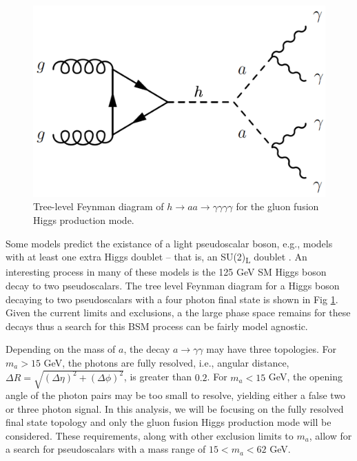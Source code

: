 \documentclass[12pt]{article}
\begin{document}
\begin{figure}
   \centering
   \includegraphics[width=0.45\linewidth]{figures/h4g-feynman-diagram.png}
   \caption{Tree-level Feynman diagram of $h\rightarrow aa \rightarrow \gamma\gamma\gamma\gamma$ for the gluon fusion Higgs production mode.}
   \label{fig:h4g-feynman-diag}
\end{figure}

Some models predict the existance of a light pseudoscalar boson, e.g., models with at least one extra Higgs doublet -- that is, an SU(2)\textsubscript{L} doublet \cite{Curtin_2014}. An interesting process in many of these models is the 125 GeV SM Higgs boson decay to two pseudoscalars. The tree level Feynman diagram for a Higgs boson decaying to two pseudoscalars with a four photon final state is shown in Fig \ref{fig:h4g-feynman-diag}. Given the current limits and exclusions, a the large phase space remains for these decays thus a search for this BSM process can be fairly model agnostic.\par

Depending on the mass of $a$, the decay $a\rightarrow \gamma\gamma$ may have three topologies. For $m_{a} > 15$ GeV, the photons are fully resolved, i.e., angular distance, $\Delta R = \sqrt{(\Delta \eta)^2 + (\Delta \phi)^2}$, is greater than $0.2$. For $m_{a} < 15$ GeV, the opening angle of the photon pairs may be too small to resolve, yielding either a false two or three photon signal. In this analysis, we will be focusing on the fully resolved final state topology and only the gluon fusion Higgs production mode will be considered. These requirements, along with other exclusion limits to $m_{a}$, allow for a search for pseudoscalars with a mass range of $15 < m_{a} < 62$ GeV.\par
\end{document}
